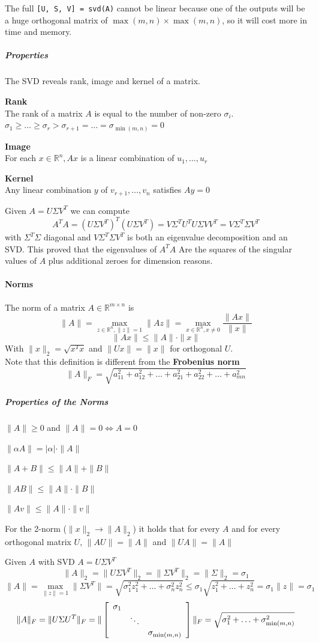 \documentclass[10pt]{report}
\begin{document}
The full \texttt{[U, S, V] = svd(A)} cannot be linear because one of the outputs will be a huge orthogonal matrix of $\max(m,n)\times \max(m,n)$, so it will cost more in time and memory.
\subparagraph{Properties} The SVD reveals rank, image and kernel of a matrix.
\begin{list}{}{}
	\item \textbf{Rank}\\
The rank of a matrix $A$ is equal to the number of non-zero $\sigma_i$. $\sigma_1\geq \ldots\geq\sigma_r > \sigma_{r+1} = \ldots = \sigma_{\min(m,n)} = 0$
	\item \textbf{Image}\\
	For each $x\in\mathbb{R}^n, Ax$ is a linear combination of $u_1,\ldots,u_r$
	\item \textbf{Kernel}\\
	Any linear combination $y$ of $v_{r+1},\ldots,v_n$ satisfies $Ay = 0$
\end{list}
Given $A = U\Sigma V^T$ we can compute $$A^T A = (U\Sigma V^T)^T(U\Sigma V^T) = V\Sigma^T U^T U \Sigma VV^T = V\Sigma^T \Sigma V^T$$ with $\Sigma^T \Sigma$ diagonal and $V\Sigma^T \Sigma V^T$ is both an eigenvalue decomposition and an SVD. This proved that the eigenvalues of $A^T A$ Are the squares of the singular values of $A$ plus additional zeroes for dimension reasons.
\paragraph{Norms} The norm of a matrix $A\in \mathbb{R}^{m\times n}$ is 
$$\|A\|=\max_{z\in \mathbb{R}^n, \|z\|=1}\|Az\| = \max_{x\in\mathbb{R}^n,x\neq 0}\frac{\|Ax\|}{\|x\|}$$
$$\|Ax\|\leq \|A\|\cdot\|x\|$$
With $\|x\|_2 = \sqrt{x^Tx}$ and $\|Ux\|=\|x\|$ for orthogonal $U$.\\
Note that this definition is different from the \textbf{Frobenius norm}
$$\|A\|_F=\sqrt{a_{11}^2+a_{12}^2+\ldots+a_{21}^2+a_{22}^2+\ldots+a_{mn}^2}$$
\subparagraph{Properties of the Norms}
\begin{list}{}{}
	\item $\|A\|\geq 0$ and $\|A\|=0\Leftrightarrow A=0$
	\item $\|\alpha A\|=|\alpha|\cdot\|A\|$
	\item $\|A+B\| \leq \|A\|+\|B\|$
	\item $\|AB\| \leq \|A\|\cdot\|B\|$
	\item $\|Av\| \leq \|A\|\cdot\|v\|$
	\item For the 2-norm ($\|x\|_2\rightarrow \|A\|_2$) it holds that for every $A$ and for every orthogonal matrix $U$, $\|AU\| = \|A\|$ and $\|UA\|=\|A\|$
\end{list}
Given $A$ with SVD $A=U\Sigma V^T$
$$\|A\|_2 = \|U\Sigma V^T\|_2 = \|\Sigma V^T\|_2 = \|\Sigma\|_2 = \sigma_1$$
$$\|A\| = \max_{\|z\| = 1} \|\Sigma V^T\| = \sqrt{\sigma_1^2 z_1^2 + \ldots + \sigma_n^2 z_n^2} \leq \sigma_1 \sqrt{z_1^2 +\ldots + z_n^2} = \sigma_1\|z\| = \sigma_1$$
$$\|A\|_F = \|U\Sigma U^T\|_F = \|\left[\begin{array}{c c c}
\sigma_1\\
&\ddots\\
&& \sigma_{\min(m,n)}
\end{array}\right]\|_F = \sqrt{\sigma_1^2+\ldots+\sigma_{\min(m,n)}^2}$$
\end{document}
